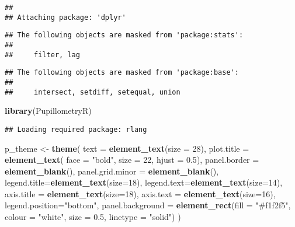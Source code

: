 \documentclass[]{book}
\newenvironment{Shaded}{\begin{snugshade}}{\end{snugshade}}
\newcommand{\DataTypeTok}[1]{\textcolor[rgb]{0.13,0.29,0.53}{#1}}
\newcommand{\DecValTok}[1]{\textcolor[rgb]{0.00,0.00,0.81}{#1}}
\newcommand{\FloatTok}[1]{\textcolor[rgb]{0.00,0.00,0.81}{#1}}
\newcommand{\KeywordTok}[1]{\textcolor[rgb]{0.13,0.29,0.53}{\textbf{#1}}}
\newcommand{\NormalTok}[1]{#1}
\newcommand{\StringTok}[1]{\textcolor[rgb]{0.31,0.60,0.02}{#1}}
\begin{document}
\begin{verbatim}
## 
## Attaching package: 'dplyr'
\end{verbatim}

\begin{verbatim}
## The following objects are masked from 'package:stats':
## 
##     filter, lag
\end{verbatim}

\begin{verbatim}
## The following objects are masked from 'package:base':
## 
##     intersect, setdiff, setequal, union
\end{verbatim}

\begin{Shaded}
\begin{Highlighting}[]
\KeywordTok{library}\NormalTok{(PupillometryR)}
\end{Highlighting}
\end{Shaded}

\begin{verbatim}
## Loading required package: rlang
\end{verbatim}

\begin{Shaded}
\begin{Highlighting}[]
\NormalTok{p_theme <-}\StringTok{ }\KeywordTok{theme}\NormalTok{(}
  \DataTypeTok{text =} \KeywordTok{element_text}\NormalTok{(}\DataTypeTok{size =} \DecValTok{28}\NormalTok{),}
  \DataTypeTok{plot.title =} \KeywordTok{element_text}\NormalTok{( }\DataTypeTok{face =} \StringTok{"bold"}\NormalTok{, }\DataTypeTok{size =} \DecValTok{22}\NormalTok{, }\DataTypeTok{hjust =} \FloatTok{0.5}\NormalTok{),}
  \DataTypeTok{panel.border =} \KeywordTok{element_blank}\NormalTok{(),}
  \DataTypeTok{panel.grid.minor =} \KeywordTok{element_blank}\NormalTok{(),}
  \DataTypeTok{legend.title=}\KeywordTok{element_text}\NormalTok{(}\DataTypeTok{size=}\DecValTok{18}\NormalTok{),}
  \DataTypeTok{legend.text=}\KeywordTok{element_text}\NormalTok{(}\DataTypeTok{size=}\DecValTok{14}\NormalTok{),}
  \DataTypeTok{axis.title =} \KeywordTok{element_text}\NormalTok{(}\DataTypeTok{size=}\DecValTok{18}\NormalTok{),}
  \DataTypeTok{axis.text =} \KeywordTok{element_text}\NormalTok{(}\DataTypeTok{size=}\DecValTok{16}\NormalTok{),}
  \DataTypeTok{legend.position=}\StringTok{"bottom"}\NormalTok{,}
  \DataTypeTok{panel.background =} \KeywordTok{element_rect}\NormalTok{(}\DataTypeTok{fill =} \StringTok{"#f1f2f5"}\NormalTok{,}
                                  \DataTypeTok{colour =} \StringTok{"white"}\NormalTok{,}
                                  \DataTypeTok{size =} \FloatTok{0.5}\NormalTok{, }\DataTypeTok{linetype =} \StringTok{"solid"}\NormalTok{)}
\NormalTok{)}
\end{Highlighting}
\end{Shaded}
\end{document}
